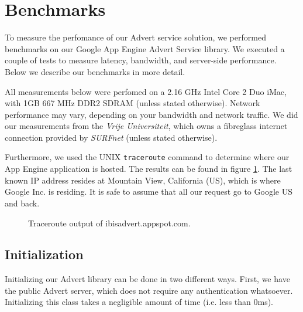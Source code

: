 \section{Benchmarks}
\label{benchmarks}
To measure the perfomance of our Advert service solution, we performed
benchmarks on our Google App Engine Advert Service library. We executed a
couple of tests to measure latency, bandwidth, and server-side performance.
Below we describe our benchmarks in more detail.

All measurements below were perfomed on a 2.16 GHz Intel Core 2 Duo iMac, with
1GB 667 MHz DDR2 SDRAM (unless stated otherwise). Network performance may vary,
depending on your bandwidth and network traffic. We did our measurements from
the \emph{Vrije Universiteit}, which owns a fibreglass internet connection
provided by \emph{SURFnet} (unless stated otherwise).

Furthermore, we used the UNIX \texttt{traceroute} command to determine where our
App Engine application is hosted. The results can be found in figure
\ref{tracert}. The last known IP address resides at Mountain View, California
(US), which is where Google Inc. is residing. It is safe to assume that all our
request go to Google US and back.

\begin{figure} %
\begin{center}
\caption{Traceroute output of ibisadvert.appspot.com.\label{tracert}}
\end{center}
\end{figure}

\subsection{Initialization}
Initializing our Advert library can be done in two different ways. First, we
have the public Advert server, which does not require any authentication 
whatsoever. Initializing this class takes a negligible amount of time (i.e.
less than 0ms).

